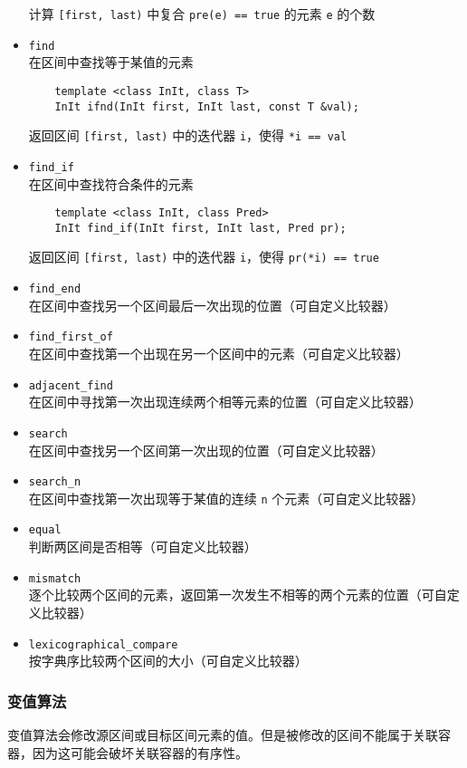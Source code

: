 \documentclass[UTF8]{ctexart}
\begin{document}
\begin{itemize}
    计算 \texttt{[first, last)} 中复合 \texttt{pre(e) == true} 的元素 \texttt{e} 的个数
    \item \texttt{find} \\
    在区间中查找等于某值的元素
    \begin{verbatim}
    template <class InIt, class T>
    InIt ifnd(InIt first, InIt last, const T &val);
    \end{verbatim}
    返回区间 \texttt{[first, last)} 中的迭代器 \texttt{i}，使得 \texttt{*i == val}
    \item \texttt{find\_if} \\
    在区间中查找符合条件的元素
    \begin{verbatim}
    template <class InIt, class Pred>
    InIt find_if(InIt first, InIt last, Pred pr);
    \end{verbatim}
    返回区间 \texttt{[first, last)} 中的迭代器 \texttt{i}，使得 \texttt{pr(*i) == true}
    \item \texttt{find\_end} \\
    在区间中查找另一个区间最后一次出现的位置（可自定义比较器）
    \item \texttt{find\_first\_of} \\
    在区间中查找第一个出现在另一个区间中的元素（可自定义比较器）
    \item \texttt{adjacent\_find} \\
    在区间中寻找第一次出现连续两个相等元素的位置（可自定义比较器）
    \item \texttt{search} \\
    在区间中查找另一个区间第一次出现的位置（可自定义比较器）
    \item \texttt{search\_n} \\
    在区间中查找第一次出现等于某值的连续 \texttt{n} 个元素（可自定义比较器）
    \item \texttt{equal} \\
    判断两区间是否相等（可自定义比较器）
    \item \texttt{mismatch} \\
    逐个比较两个区间的元素，返回第一次发生不相等的两个元素的位置（可自定义比较器）
    \item \texttt{lexicographical\_compare} \\
    按字典序比较两个区间的大小（可自定义比较器）
\end{itemize}

\subsubsection{变值算法}
变值算法会修改源区间或目标区间元素的值。但是被修改的区间不能属于关联容器，因为这可能会破坏关联容器的有序性。
\end{document}

